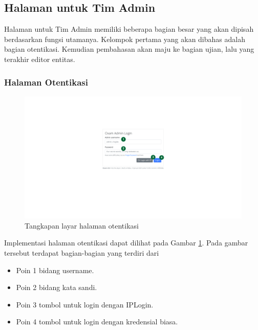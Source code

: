     \subsection{Halaman untuk Tim Admin}
    Halaman untuk Tim Admin memiliki beberapa bagian besar yang akan dipisah berdasarkan fungsi utamanya.
    Kelompok pertama yang akan dibahas adalah bagian otentikasi. Kemudian pembahasan akan maju ke bagian
    ujian, lalu yang terakhir editor entitas.
    
    \subsubsection{Halaman Otentikasi}
    \begin{figure}
        \centering
        \includegraphics[width=0.7\paperwidth]{Gambar/implemented-interface/admin/login.png}
        \caption{Tangkapan layar halaman otentikasi}
        \label{fig:screenshot-admin-authentication}
    \end{figure}
    Implementasi halaman otentikasi dapat dilihat pada Gambar \ref{fig:screenshot-admin-authentication}. Pada
    gambar tersebut terdapat bagian-bagian yang terdiri dari
    \begin{itemize}
        \item Poin 1 bidang username.
        \item Poin 2 bidang kata sandi.
        \item Poin 3 tombol untuk login dengan IPLogin.
        \item Poin 4 tombol untuk login dengan kredensial biasa.
    \end{itemize}
    
